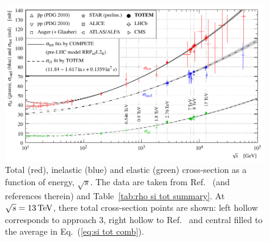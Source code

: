 \begin{figure}
\vskip-5mm
\begin{center}
\includegraphics{fig/sigma_tot_el_inel_vs_s.pdf}
\vskip-3mm
\caption{%
Total (red), inelastic (blue) and elastic (green) cross-section as a function of energy, $\sqrt s$. The data are taken from Ref.~\cite{totem-13tev-90m} (and references therein) and Table~\ref{tab:rho si tot summary}. At $\sqrt s = 13\,{\rm TeV}$, there total cross-section points are shown: left hollow corresponds to approach 3, right hollow to Ref.~\cite{totem-13tev-90m} and central filled to the average in Eq.~(\ref{eq:si tot comb}).
}
\label{fig:si tot inel el}
\end{center}
\vskip-3mm
\end{figure}
